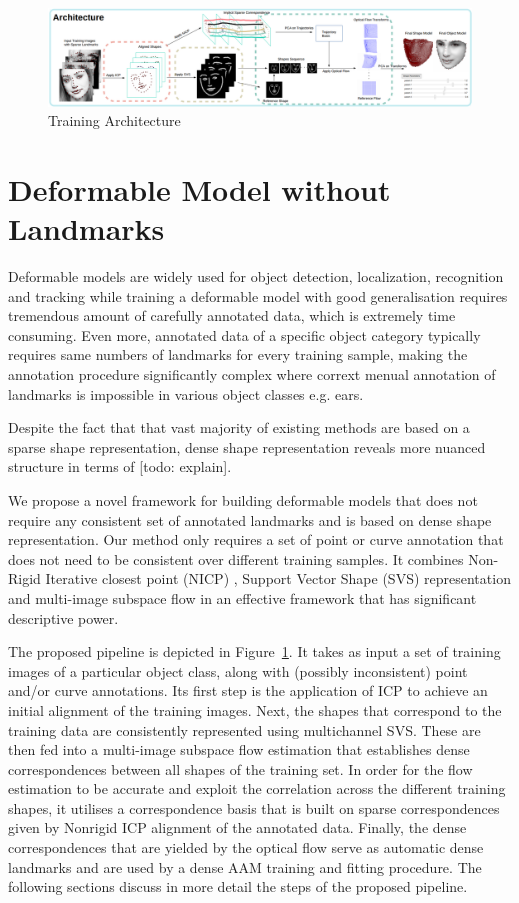\begin{figure}[t!]
    \centering
        \includegraphics[width=\textwidth]{resources/architecture}
    \caption{Training Architecture}
    \label{fig:archi}
\end{figure}

\section{Deformable Model without Landmarks}

Deformable models are widely used for object detection, localization, recognition and tracking while training a deformable model with good generalisation requires tremendous amount of carefully annotated data, which is extremely time consuming. Even more, annotated data of a specific object category typically requires same numbers of landmarks for every training sample, making the annotation procedure significantly complex where corrext menual annotation of landmarks is impossible in various object classes e.g. ears.

Despite the fact that that vast majority of existing methods are based on a sparse shape representation, dense shape representation reveals more nuanced structure in terms of [todo: explain].

We propose a novel framework for building deformable models that does not require any consistent set of annotated landmarks and is based on dense shape representation. Our method only requires a set of point or curve annotation that does not need to be consistent over different training samples. It combines Non-Rigid Iterative closest point (NICP) \cite{}, Support Vector Shape (SVS) \cite{} representation and multi-image subspace flow \cite{} in an effective framework that has significant descriptive power.

The proposed pipeline is depicted in Figure~\ref{fig:archi}. It takes as input a set of training images of a particular object class, along with (possibly inconsistent) point and/or curve annotations. Its first step is the application of ICP to achieve an initial alignment of the training images. Next, the shapes that correspond to the training data are consistently represented using multichannel SVS. These are then fed into a multi-image subspace flow estimation that establishes dense correspondences between all shapes of the training set. In order for the flow estimation to be accurate and exploit the correlation across the different training shapes, it utilises a correspondence basis that is built on sparse correspondences given by Nonrigid ICP alignment of the annotated data. Finally, the dense correspondences that are yielded by the optical flow serve as automatic dense landmarks and are used by a dense AAM training and fitting procedure. The following sections discuss in more detail the steps of the proposed pipeline.


